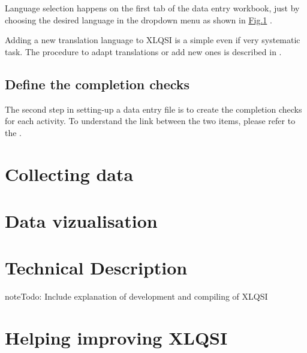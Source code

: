 \documentclass[letterpaper,10pt,english]{sphinxmanual}
\begin{document}
Language selection happens on the first tab of the data entry workbook, just by choosing the desired language in the dropdown menu as shown in \hyperref[\detokenize{create_data_entry:translation}]{Fig.\@ \ref{\detokenize{create_data_entry:translation}}} .

\begin{figure}[htbp]
\centering

\noindent{}
\label{\detokenize{create_data_entry:translation}}\end{figure}

Adding a new translation language to XLQSI is a simple even if very systematic task. The procedure to adapt translations or add new ones is described in {\hyperref[\detokenize{technical::doc}]{}}.


\section{Define the completion checks}
\label{\detokenize{create_data_entry:id1}}\label{\detokenize{create_data_entry:define-the-completion-checks}}
The second step in setting-up a data entry file is to create the completion checks for each activity. To understand the link between the two items, please refer to the {\hyperref[\detokenize{intro::doc}]{}}.


\chapter{Collecting data}
\label{\detokenize{fill_data_entry:collecting-data}}\label{\detokenize{fill_data_entry::doc}}

\chapter{Data vizualisation}
\label{\detokenize{data_viz::doc}}\label{\detokenize{data_viz:data-vizualisation}}

\chapter{Technical Description}
\label{\detokenize{technical:technical-description}}\label{\detokenize{technical::doc}}
\begin{sphinxadmonition}{note}{\label{technical:index-0}Todo:}
Include explanation of development and compiling of XLQSI
\end{sphinxadmonition}


\chapter{Helping improving XLQSI}
\label{\detokenize{contribute:helping-improving-xlqsi}}\label{\detokenize{contribute::doc}}


\renewcommand{\indexname}{Index}
\printindex
\end{document}
